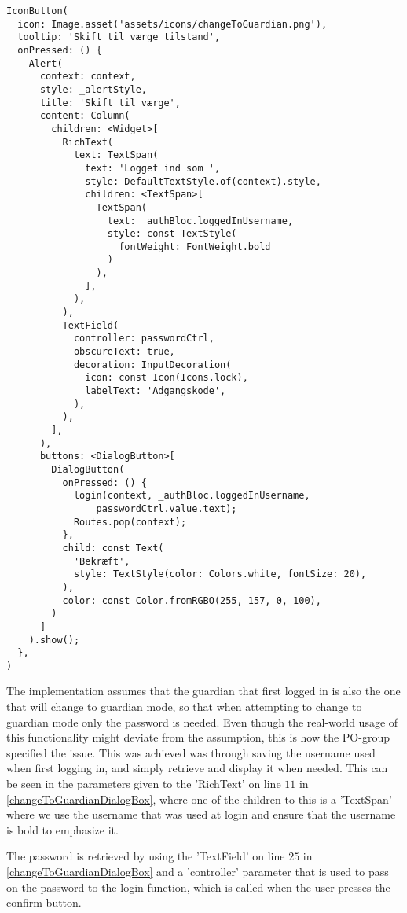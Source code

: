 \begin{lstlisting}[caption={Dialogbox for confirming password},captionpos=b, label=changeToGuardianDialogBox]
IconButton(
  icon: Image.asset('assets/icons/changeToGuardian.png'),
  tooltip: 'Skift til værge tilstand',
  onPressed: () {
    Alert(
      context: context,
      style: _alertStyle,
      title: 'Skift til værge',
      content: Column(
        children: <Widget>[
          RichText(
            text: TextSpan(
              text: 'Logget ind som ',
              style: DefaultTextStyle.of(context).style,
              children: <TextSpan>[
                TextSpan(
                  text: _authBloc.loggedInUsername,
                  style: const TextStyle(
                    fontWeight: FontWeight.bold
                  )
                ),
              ],
            ),
          ),
          TextField(
            controller: passwordCtrl,
            obscureText: true,
            decoration: InputDecoration(
              icon: const Icon(Icons.lock),
              labelText: 'Adgangskode',
            ),
          ),
        ],
      ),
      buttons: <DialogButton>[
        DialogButton(
          onPressed: () {
            login(context, _authBloc.loggedInUsername,
                passwordCtrl.value.text);
            Routes.pop(context);
          },
          child: const Text(
            'Bekræft',
            style: TextStyle(color: Colors.white, fontSize: 20),
          ),
          color: const Color.fromRGBO(255, 157, 0, 100),
        )
      ]
    ).show();
  },
)
\end{lstlisting}

The implementation assumes that the guardian that first logged in is also the one that will change to guardian mode, so that when attempting to change to guardian mode only the password is needed.
Even though the real-world usage of this functionality might deviate from the assumption, this is how the PO-group specified the issue.
This was achieved was through saving the username used when first logging in, and simply retrieve and display it when needed.
This can be seen in the parameters given to the 'RichText' on line $11$ in \autoref{changeToGuardianDialogBox}, where one of the children to this is a 'TextSpan' where we use the username that was used at login and ensure that the username is bold to emphasize it.

The password is retrieved by using the 'TextField' on line $25$ in \autoref{changeToGuardianDialogBox} and a 'controller' parameter that is used to pass on the password to the login function, which is called when the user presses the confirm button.

